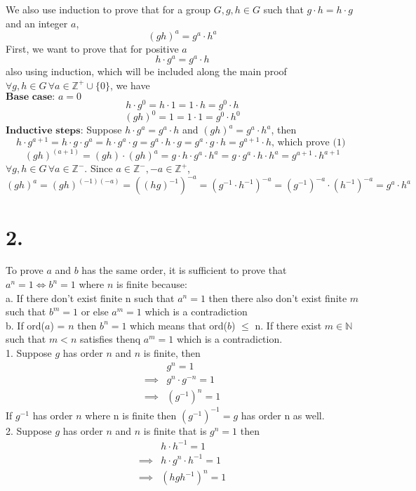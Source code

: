 \documentclass[11pt]{article}
\begin{document}
We also use induction to prove that for a group $G, g, h \in G$ such that $g \cdot h = h \cdot g$ and an integer $a$,
\[
(gh)^a = g^a \cdot h^a
\]
First, we want to prove that for positive $a$
\begin{equation}
h \cdot g^a = g^a \cdot h
\end{equation}
 also using induction, which will be included along the main proof \\
$\forall g, h \in G \, \forall a \in \mathbb{Z}^+ \cup \{0\}$, we have \\
$\textbf{Base case: } a=0$
\[
h \cdot g^0 = h \cdot 1 = 1 \cdot h = g^0 \cdot h
\]
\[
(gh)^0 = 1 = 1 \cdot 1 = g^0 \cdot h^0
\]
$\textbf{Inductive steps:}$ Suppose $h \cdot g^a = g^a \cdot h$ and $(gh)^a = g^a \cdot h^a$, then
\[
h \cdot g^{a+1} = h \cdot g \cdot g^a = h \cdot g^a \cdot g = g^a \cdot h \cdot g = g^a \cdot g \cdot h = g^{a+1} \cdot h \text{, which prove (1) } 
\]
\[
(gh)^{(a+1)} = (gh) \cdot (gh)^a = g \cdot h \cdot g^a \cdot h^a  = g \cdot g^a \cdot h \cdot h^a = g^{a+1} \cdot h^{a+1}
\]
$\forall g, h \in G \, \forall a \in \mathbb{Z}^-$. Since $a \in \mathbb{Z}^-, -a \in \mathbb{Z}^+$,
\[
(gh)^a = (gh)^{(-1)(-a)} = ((hg)^{-1})^{-a} = (g^{-1} \cdot h^{-1})^{-a} = (g^{-1})^{-a} \cdot (h^{-1})^{-a} = g^a \cdot h^a 	 
\]






\pagebreak
\section*{2.}
To prove $a$ and $b$ has the same order, it is sufficient to prove that $a^n = 1 \iff b^n = 1$ where $n$ is finite because: \\
\indent a. If there don't exist finite n such that $a^n = 1$ then there also don't exist finite $m$ such that $b^m = 1$ or else $a^m = 1$ which is a contradiction \\
\indent b. If ord($a$) = $n$ then $b^n = 1$ which means that ord($b$) $\le$ n. If there exist $m \in \mathbb{N}$ such that $m<n$ satisfies thenq $a^m = 1$ which is a contradiction. \\
1. Suppose $g$ has order $n$ and $n$ is finite, then
\begin{equation*}
\begin{aligned}
&g^n = 1 \\ 
\implies & g^n \cdot g^{-n} = 1 \\
\implies & (g^{-1})^n = 1
\end{aligned}
\end{equation*}
If $g^{-1}$ has order $n$ where n is finite then $(g^{-1})^{-1} = g$ has order n as well. \\
2. Suppose $g$ has order $n$ and $n$ is finite that is $g^n = 1$ then
\begin{equation*}
\begin{aligned}
&h \cdot h^{-1} = 1 \\
\implies & h \cdot g^n \cdot h^{-1} = 1 \\
\implies & (hgh^{-1})^n = 1
\end{aligned}
\end{equation*}
\end{document}
